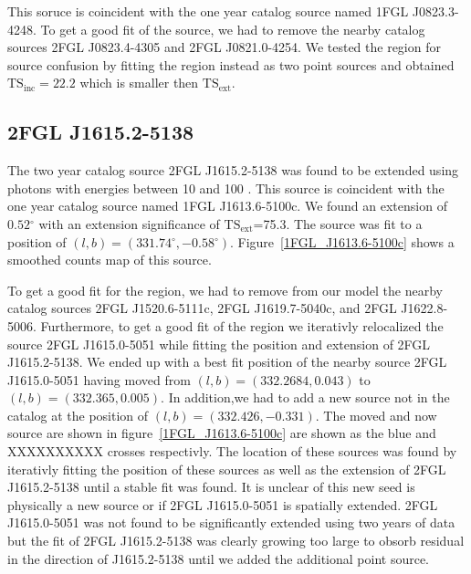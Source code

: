 \documentclass[12pt,preprint]{aastex}
\newcommand{\gev}{\text{GeV}\xspace}
\newcommand{\tsext}{{\ensuremath{\text{TS}_\text{ext}}}\xspace}
\newcommand{\tsinc}{\ensuremath{\text{TS}_\text{inc}}\xspace}
\renewcommand{\deg}{\ensuremath{^\circ}\xspace}
\begin{document}
This soruce is coincident with the one year catalog source named 1FGL J0823.3-4248.
To get a good fit of the source, we had to remove the nearby catalog
sources 2FGL J0823.4-4305 and 2FGL J0821.0-4254.  We tested the 
region for source confusion by fitting the region instead as two point
sources and obtained $\tsinc=22.2$ which is smaller then \tsext.


\subsection{2FGL J1615.2-5138}


The two year catalog source 2FGL J1615.2-5138 was found to be
extended using photons with energies between 10 \gev and 100 \gev.
This source is coincident with the one year catalog source named 1FGL
J1613.6-5100c.  We found an extension of $0.52\deg$ with an extension
significance of \tsext=75.3.  The source was fit to a position of
$(l,b)=(331.74\deg,-0.58\deg)$.  Figure~\ref{1FGL_J1613.6-5100c} shows
a smoothed counts map of this source.

 To get a good fit for the region, we had to remove from our
model the nearby catalog sources 2FGL J1520.6-5111c, 2FGL J1619.7-5040c,
and 2FGL J1622.8-5006. Furthermore, to get a good fit of the region
we iterativly relocalized the source 2FGL J1615.0-5051 while fitting
the position and extension of 2FGL J1615.2-5138.  We ended up with
a best fit position of the nearby source 2FGL J1615.0-5051 having
moved from $(l,b)=(332.2684,0.043)$ to $(l,b)=(332.365,0.005)$.
In addition,we had to add a new source not in the catalog at the position
of $(l,b)=(332.426,-0.331)$. The moved and now source are shown in
figure~\ref{1FGL_J1613.6-5100c} are shown as the blue and XXXXXXXXXX crosses
respectivly.  The location of these sources was found by iterativly
fitting the position of these sources as well as the extension of 2FGL
J1615.2-5138 until a stable fit was found.  It is unclear of this new seed
is physically a new source or if 2FGL J1615.0-5051 is spatially extended.
2FGL J1615.0-5051 was not found to be significantly extended using two
years of data but the fit of 2FGL J1615.2-5138 was clearly growing
too large to obsorb residual in the direction of 
J1615.2-5138 until we added the additional point source.
\end{document}
